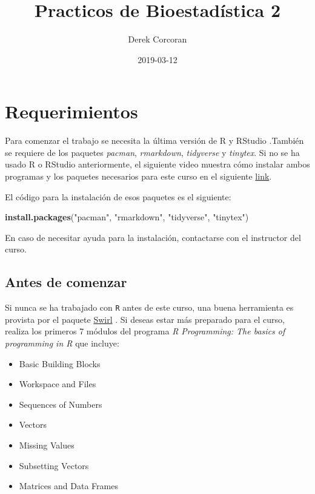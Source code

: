 \documentclass[]{book}
\title{Practicos de Bioestadística 2}
\author{Derek Corcoran}
\date{2019-03-12}
\newenvironment{Shaded}{\begin{snugshade}}{\end{snugshade}}
\newcommand{\KeywordTok}[1]{\textcolor[rgb]{0.13,0.29,0.53}{\textbf{#1}}}
\newcommand{\NormalTok}[1]{#1}
\newcommand{\StringTok}[1]{\textcolor[rgb]{0.31,0.60,0.02}{#1}}
\providecommand{\tightlist}{%
  \setlength{\itemsep}{0pt}\setlength{\parskip}{0pt}}
\begin{document}
\maketitle

{
\setcounter{tocdepth}{1}
\tableofcontents
}
\hypertarget{requerimientos}{%
\chapter*{Requerimientos}\label{requerimientos}}

Para comenzar el trabajo se necesita la última versión de R y RStudio \citep{R-base}.También se requiere de los paquetes \emph{pacman}, \emph{rmarkdown}, \emph{tidyverse} y \emph{tinytex}. Si no se ha usado R o RStudio anteriormente, el siguiente video muestra cómo instalar ambos programas y los paquetes necesarios para este curso en el siguiente \href{https://youtu.be/RtkCAKXsVbw}{link}.

El código para la instalación de esos paquetes es el siguiente:

\begin{Shaded}
\begin{Highlighting}[]
\KeywordTok{install.packages}\NormalTok{(}\StringTok{"pacman"}\NormalTok{, }\StringTok{"rmarkdown"}\NormalTok{, }\StringTok{"tidyverse"}\NormalTok{, }\StringTok{"tinytex"}\NormalTok{)}
\end{Highlighting}
\end{Shaded}

En caso de necesitar ayuda para la instalación, contactarse con el instructor del curso.

\hypertarget{antes-de-comenzar}{%
\section{Antes de comenzar}\label{antes-de-comenzar}}

Si nunca se ha trabajado con \texttt{R} antes de este curso, una buena herramienta es provista por el paquete \href{http://swirlstats.com/students.html}{Swirl} \citep{Kross2017}. Si deseas estar más preparado para el curso, realiza los primeros 7 módulos del programa \emph{R Programming: The basics of programming in R} que incluye:

\begin{itemize}
\tightlist
\item
  Basic Building Blocks
\item
  Workspace and Files
\item
  Sequences of Numbers
\item
  Vectors
\item
  Missing Values
\item
  Subsetting Vectors
\item
  Matrices and Data Frames
\end{itemize}
\end{document}
